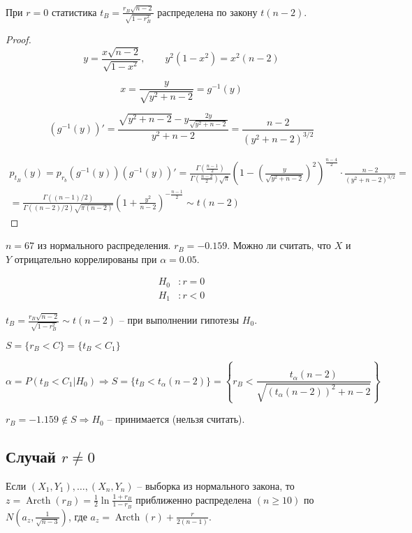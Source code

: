 \begin{theorem}
  При $r=0$ статистика $t_B = \frac{r_B \sqrt{n-2}}{\sqrt{1 - r_B^2}}$
  распределена по закону $t(n-2)$.
\end{theorem}
\begin{proof}
  \[
    y = \frac{x \sqrt{n-2}}{\sqrt{1-x^2}}, \qquad y^2 (1-x^2) = x^2 (n-2)
  \]

  \[
    x = \frac{y}{\sqrt{y^2+n-2}} = g^{-1} (y)
  \]

  \[
    (g^{-1} (y))' = \frac{\sqrt{y^2+n-2} - y \frac{2y}{\sqrt{y^2+n-2}} }{y^2+n-2} = \frac{n-2}{(y^2 + n - 2)^{3/2}}
  \]

  \begin{multline*}
    p_{t_B} (y) = p_{r_b} (g^{-1}(y)) (g^{-1}(y))'
    = \frac{\Gamma(\frac{n-1}{2})}{\Gamma(\frac{n-2}{2}) \sqrt{\pi}}
    (1-(\frac{y}{\sqrt{y^2+n-2}})^2)^{\frac{n-4}{2}} \cdot
    \frac{n-2}{(y^2 + n - 2)^{3/2}} = \\
    = \frac{\Gamma\left((n-1)/2\right)}{\Gamma\left((n-2)/2\right) \sqrt{\pi (n-2)}} \left(1 + \frac{y^2}{n-2}\right)^{-\frac{n-1}{2}} \sim t(n-2)
  \end{multline*}
\end{proof}

\begin{ex}
  $n=67$ из нормального распределения. $r_B = -0.159$. Можно ли считать, что $X$ и $Y$ отрицательно коррелированы при $\alpha = 0.05$.

  \begin{align*}
    H_0 &: r = 0 \\
    H_1 &: r < 0
  \end{align*}

  $t_B = \frac{r_B \sqrt{n-2}}{\sqrt{1-r_B^2}} \sim t(n-2)$ -- при выполнении гипотезы $H_0$.

  $S = \{r_B < C\} = \{ t_B < C_1\}$

  \[
    \alpha = P(t_B < C_1 | H_0) \Rightarrow S = \{ t_B < t_\alpha (n-2) \} = 
    \left\{ r_B < \frac{t_\alpha (n-2)}{\sqrt{ (t_\alpha(n-2))^2 + n-2 }}\right\}
  \]

  $r_B = -1.159 \notin S \Rightarrow H_0$ -- принимается (нельзя считать). 
\end{ex}

\subsection{Случай $r \neq 0$}

\begin{theorem}[Фишера]
  Если $(X_1, Y_1), \dots, (X_n, Y_n)$ -- выборка из нормального закона, то
  $z = \operatorname{Arcth} (r_B) = \frac{1}{2} \ln \frac{1 + r_B}{1 - r_B}$
  приближенно распределена $(n \geqslant 10)$ по
  $N\left(a_z, \frac{1}{\sqrt{n-3}}\right)$, где
  $a_z = \operatorname{Arcth} (r) + \frac{r}{2(n-1)}$.
\end{theorem}

